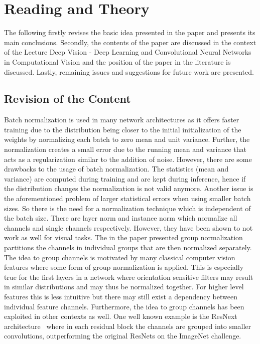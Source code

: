 \section{Reading and Theory}\label{sec:reading-and-theory}
The following firstly revises the basic idea presented in the paper and presents its main conclusions.
Secondly, the contents of the paper are discussed in the context of the Lecture Deep Vision - Deep Learning and Convolutional Neural Networks in Computational Vision and the position of the paper in the literature is discussed.
Lastly, remaining issues and suggestions for future work are presented.

\subsection{Revision of the Content}
Batch normalization is used in many network architectures as it offers faster training due to the distribution being closer to the initial initialization of the weights by normalizing each batch to zero mean and unit variance.
Further, the normalization creates a small error due to the running mean and variance that acts as a regularization similar to the addition of noise.
However, there are some drawbacks to the usage of batch normalization.
The statistics (mean and variance) are computed during training and are kept during inference, hence if the distribution changes the normalization is not valid anymore.
Another issue is the aforementioned problem of larger statistical errors when using smaller batch sizes.
So there is the need for a normalization technique which is independent of the batch size.
There are layer norm and instance norm which normalize all channels and single channels respectively.
However, they have been shown to not work as well for visual tasks.
The in the paper presented group normalization partitions the channels in individual groups that are then normalized separately.
The idea to group channels is motivated by many classical computer vision features where some form of group normalization is applied.
This is especially true for the first layers in a network where orientation sensitive filters may result in similar distributions and may thus be normalized together.
For higher level features this is less intuitive but there may still exist a dependency between individual feature channels.
Furthermore, the idea to group channels has been exploited in other contexts as well.
One well known example is the ResNext architecture~\cite{DBLP:journals/corr/XieGDTH16} where in each residual block the channels are grouped into smaller convolutions, outperforming the original ResNets on the ImageNet challenge.\\

